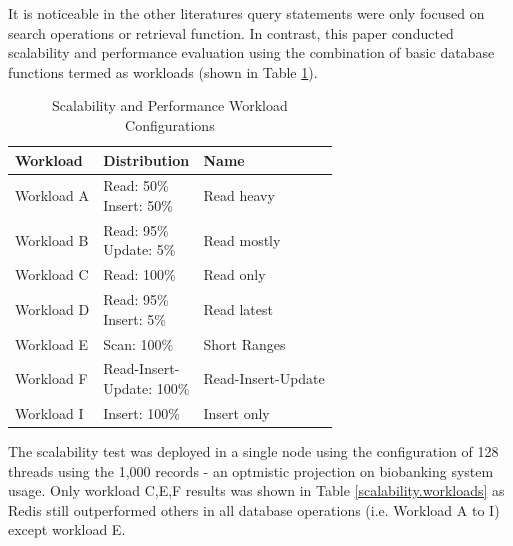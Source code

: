 \documentclass[5p]{elsarticle}
\begin{document}
It is noticeable in the other literatures \cite{N.Zeng20171116,Z.Goli-Malekabadi201675,G.D.Ferreira2013125,K.Lee201299,J.Gilchrist20113244} query statements were only focused on search operations or retrieval function. 
In contrast, this paper conducted scalability and performance evaluation using the combination of basic database functions termed as workloads (shown in Table \ref{table.workload.definition}).

\begin{table}[ht]
    \centering															
    \caption{Scalability and Performance Workload Configurations}
     \label{table.workload.definition}
     \begin{tabular}{lll}
        \toprule
        Workload & Distribution & Name \\
        \hline
        \rule{0pt}{20pt}Workload A &\makecell[l]{ Read: 50\%  \\ Insert: 50\%} & Read heavy        \\
        \rule{0pt}{20pt}Workload B &\makecell[l]{ Read: 95\%  \\ Update: 5\%}  & Read mostly       \\
        \rule{0pt}{20pt}Workload C &\makecell[l]{ Read: 100\% \\ }             & Read only         \\
        \rule{0pt}{20pt}Workload D &\makecell[l]{ Read: 95\%  \\ Insert: 5\%}  & Read latest       \\
        \rule{0pt}{20pt}Workload E & Scan: 100\%                               & Short Ranges      \\
        \rule{0pt}{20pt}Workload F &\makecell[l]{ Read-Insert-\\Update: 100\%} & Read-Insert-Update\\
        \rule{0pt}{12pt}Workload I &\makecell[l]{ Insert: 100\%\\ }            & Insert only       \\
        \hline
    \end{tabular}															
\end{table}		

The scalability test was deployed in a single node using the configuration of 128 threads using the 1,000 records - an optmistic projection on biobanking system usage. 
Only workload C,E,F results was shown in Table \ref{scalability.workloads} as Redis still outperformed others in all database operations (i.e. Workload A to I) except workload E.  
													
\end{document}
